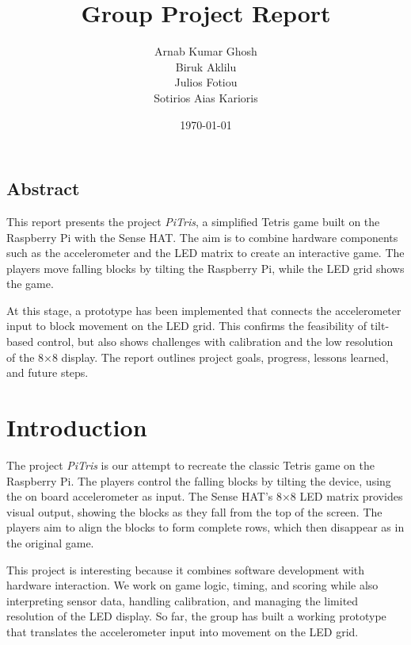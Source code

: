 \documentclass[11pt,titlepage,openright]{book}
\begin{document}
\frontmatter
\title{Group Project Report}
\author{Arnab Kumar Ghosh \\ 
        Biruk Aklilu \\ 
        Julios Fotiou \\ 
        Sotirios Aias Karioris}
\date{\today}

\maketitle

\vspace*{3cm}
\section*{Abstract}
This report presents the project \textit{PiTris}, a simplified Tetris game built on the Raspberry Pi with the Sense HAT. The aim is to combine hardware components such as the accelerometer and the LED matrix to create an interactive game. The players move falling blocks by tilting the Raspberry Pi, while the LED grid shows the game.

At this stage, a prototype has been implemented that connects the accelerometer input to block movement on the LED grid. This confirms the feasibility of tilt-based control, but also shows challenges with calibration and the low resolution of the 8×8 display. The report outlines project goals, progress, lessons learned, and future steps.


\tableofcontents

\mainmatter

\chapter{Introduction}
The project \textit{PiTris} is our attempt to recreate the classic Tetris game on the Raspberry Pi. The players control the falling blocks by tilting the device, using the on board accelerometer as input. The Sense HAT’s 8×8 LED matrix provides visual output, showing the blocks as they fall from the top of the screen. The players aim to align the blocks to form complete rows, which then disappear as in the original game.  

This project is interesting because it combines software development with hardware interaction. We work on game logic, timing, and scoring while also interpreting sensor data, handling calibration, and managing the limited resolution of the LED display. So far, the group has built a working prototype that translates the accelerometer input into movement on the LED grid.
\end{document}
